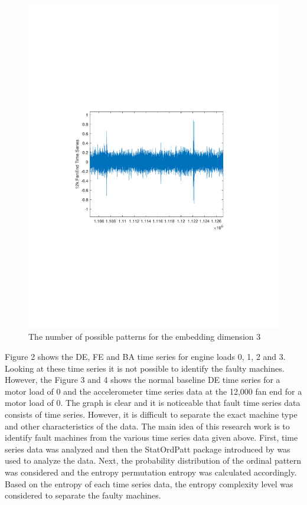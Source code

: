 \documentclass[sn-basic,pdflatex]{sn-jnl}
\theoremstyle{remark}
\theoremstyle{definition}
\begin{document}
\begin{figure}
\includegraphics{./fanend12kDE} \caption{The number of possible patterns for the embedding dimension 3}\label{fig:unnamed-chunk-3}
\end{figure}

Figure 2 shows the DE, FE and BA time series for engine loads 0, 1, 2
and 3. Looking at these time series it is not possible to identify the
faulty machines. However, the Figure 3 and 4 shows the normal baseline
DE time series for a motor load of 0 and the accelerometer time series
data at the 12,000 fan end for a motor load of 0. The graph is clear and
it is noticeable that fault time series data consists of time series.
However, it is difficult to separate the exact machine type and other
characteristics of the data. The main idea of this research work is to
identify fault machines from the various time series data given above.
First, time series data was analyzed and then the StatOrdPatt package
introduced by \citet{REY2024115481} was used to analyze the data. Next,
the probability distribution of the ordinal pattern was considered and
the entropy permutation entropy was calculated accordingly. Based on the
entropy of each time series data, the entropy complexity level was
considered to separate the faulty machines.
\end{document}
